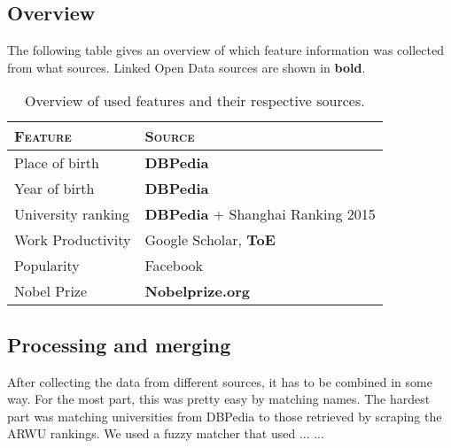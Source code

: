 \subsection{Overview}

The following table gives an overview of which feature information was collected from what sources. Linked Open Data sources are shown in \textbf{bold}.

\begin{table}[H]
\centering
\begin{tabular}{l|l}
	\textbf{\textsc{Feature}} & \textbf{\textsc{Source}} \\ \hline
	\rule{0pt}{4mm}Place of birth & \textbf{DBPedia} \\
	Year of birth & \textbf{DBPedia} \\
	University ranking & \textbf{DBPedia} + Shanghai Ranking 2015\\
	Work Productivity & Google Scholar, \textbf{ToE}\\
	Popularity & Facebook\\
	Nobel Prize& \textbf{Nobelprize.org}
\end{tabular}
\caption{Overview of used features and their respective sources.}
\end{table}

\subsection{Processing and merging}
\label{ssec:merging}
After collecting the data from different sources, it has to be combined in some way. For the most part, this was pretty easy by matching names. The hardest part was matching universities from DBPedia to those retrieved by scraping the ARWU rankings.
We used a fuzzy matcher that used ... ...
